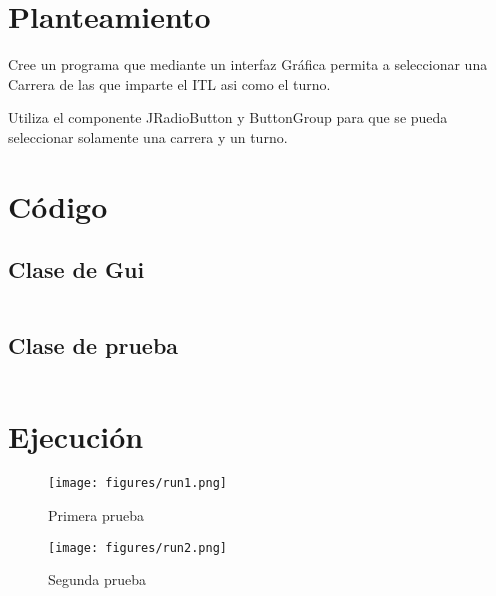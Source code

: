 \documentclass[12pt]{article}
\author{Pablo Vargas Bermúdez}
\begin{document}
\pagestyle{empty}



\section*{Planteamiento}

Cree un programa que mediante un interfaz Gráfica permita a
seleccionar una Carrera de las que imparte el ITL asi como el turno.

Utiliza el componente JRadioButton y ButtonGroup para que se pueda
seleccionar solamente una carrera y un turno.

\section*{Código}

\subsection*{Clase de Gui}
\inputminted{Java}{Carreras.java}
\subsection*{Clase de prueba}
\inputminted{Java}{Prueba.java}

\section*{Ejecución}

\begin{figure}[ht]
  \centering
  \texttt{[image: figures/run1.png]}
  \caption{Primera prueba}
\end{figure}

\begin{figure}[ht]
  \centering
  \texttt{[image: figures/run2.png]}
  \caption{Segunda prueba}
\end{figure}
\end{document}
